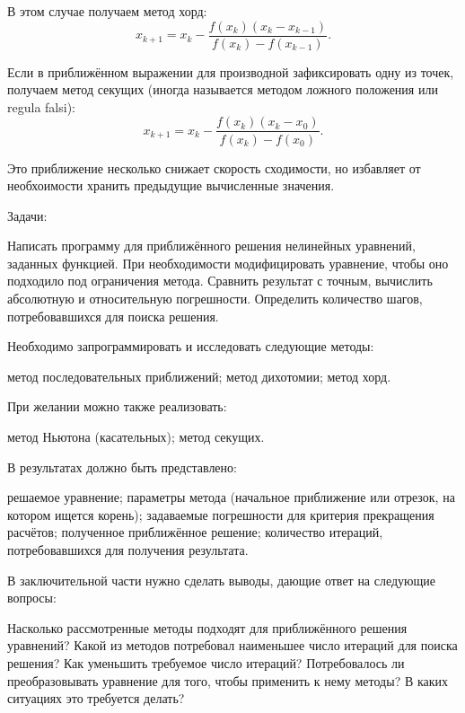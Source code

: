 В этом случае получаем метод хорд:
\[
x_{k+1}=x_{k}-\frac{f(x_{k})(x_{k}-x_{k-1})}{f(x_{k})-f(x_{k-1})}.
\]


Если в приближённом выражении для производной зафиксировать одну из
точек, получаем метод секущих (иногда называется методом ложного положения
или regula falsi):
\[
x_{k+1}=x_{k}-\frac{f(x_{k})(x_{k}-x_{0})}{f(x_{k})-f(x_{0})}.
\]


Это приближение несколько снижает скорость сходимости, но избавляет
от необхоимости хранить предыдущие вычисленные значения.

Задачи:

Написать программу для приближённого решения нелинейных уравнений,
заданных функцией. При необходимости модифицировать уравнение, чтобы
оно подходило под ограничения метода. Сравнить результат с точным,
вычислить абсолютную и относительную погрешности. Определить количество
шагов, потребовавшихся для поиска решения.

Необходимо запрограммировать и исследовать следующие методы:

метод последовательных приближений; метод дихотомии; метод хорд.

При желании можно также реализовать:

метод Ньютона (касательных); метод секущих.

В результатах должно быть представлено:

решаемое уравнение; параметры метода (начальное приближение или отрезок,
на котором ищется корень); задаваемые погрешности для критерия прекращения
расчётов; полученное приближённое решение; количество итераций, потребовавшихся
для получения результата.

В заключительной части нужно сделать выводы, дающие ответ на следующие
вопросы:

Насколько рассмотренные методы подходят для приближённого решения
уравнений? Какой из методов потребовал наименьшее число итераций для
поиска решения? Как уменьшить требуемое число итераций? Потребовалось
ли преобразовывать уравнение для того, чтобы применить к нему методы?
В каких ситуациях это требуется делать?

\newpage{}
